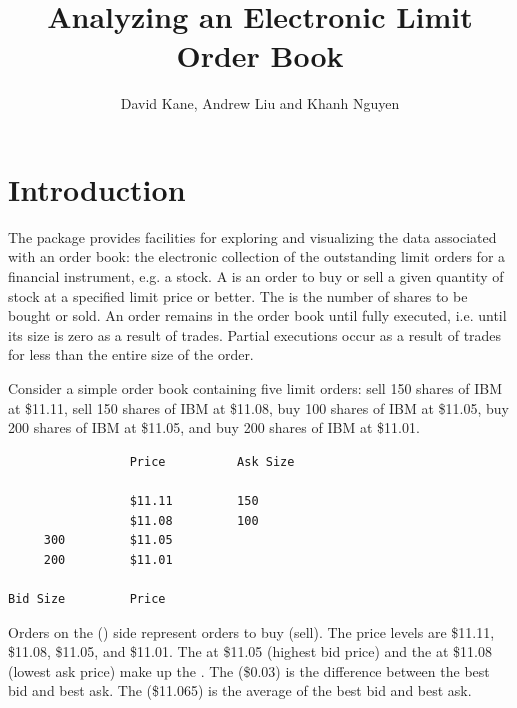 \title{Analyzing an Electronic Limit Order Book}
\author{David Kane, Andrew Liu and Khanh Nguyen}

\maketitle



\section{Introduction}

The  package provides facilities for exploring and
visualizing the data associated with an order book: the electronic
collection of the outstanding limit orders for a financial instrument,
e.g. a stock. A  is an order to buy or sell a given
quantity of stock at a specified limit price or better. The
 is the number of shares to be bought or sold.  An order
remains in the order book until fully executed, i.e. until its size is
zero as a result of trades. Partial executions occur as a result of
trades for less than the entire size of the order.

Consider a simple order book containing five limit orders: sell 150
shares of IBM at \$11.11, sell 150 shares of IBM at \$11.08, buy 100
shares of IBM at \$11.05, buy 200 shares of IBM at \$11.05, and buy
200 shares of IBM at \$11.01.

\begin{verbatim}
                 Price          Ask Size

                 $11.11         150
                 $11.08         100
     300         $11.05
     200         $11.01

Bid Size         Price
\end{verbatim}

\noindent Orders on the  () side represent orders to buy
(sell). The price levels are \$11.11, \$11.08, \$11.05, and
\$11.01. The  at \$11.05 (highest bid price) and the
 at \$11.08 (lowest ask price) make up the . The  (\$0.03) is the difference between the
best bid and best ask. The  (\$11.065) is the average
of the best bid and best ask.

